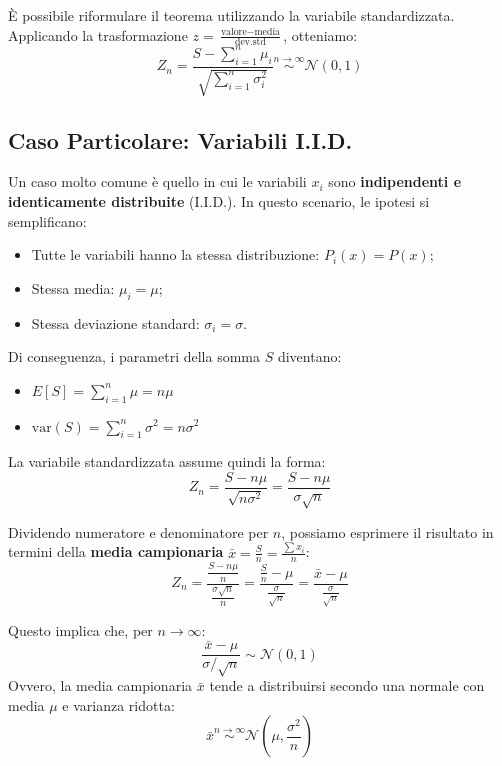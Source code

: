 \documentclass[openany,a4paper,12pt]{book}
\theoremstyle{remark}
\begin{document}
È possibile riformulare il teorema utilizzando la variabile standardizzata. Applicando la trasformazione $z = \frac{\text{valore} - \text{media}}{\text{dev.std}}$, otteniamo:
\[
Z_n = \frac{S - \sum_{i=1}^{n} \mu_i}{\sqrt{\sum_{i=1}^{n} \sigma_i^2}} \overset{n \to \infty}{\sim} \mathcal{N}(0,1)
\]

\subsection*{Caso Particolare: Variabili I.I.D.}
Un caso molto comune è quello in cui le variabili $x_i$ sono \textbf{indipendenti e identicamente distribuite} (I.I.D.). In questo scenario, le ipotesi si semplificano:
\begin{itemize}
    \item Tutte le variabili hanno la stessa distribuzione: $P_i(x) = P(x)$;
    \item Stessa media: $\mu_i = \mu$;
    \item Stessa deviazione standard: $\sigma_i = \sigma$.
\end{itemize}

Di conseguenza, i parametri della somma $S$ diventano:
\begin{itemize}
    \item $E[S] = \sum_{i=1}^n \mu = n\mu$
    \item $\text{var}(S) = \sum_{i=1}^n \sigma^2 = n\sigma^2$
\end{itemize}

La variabile standardizzata assume quindi la forma:
\begin{equation}
Z_n = \frac{S - n\mu}{\sqrt{n\sigma^2}} = \frac{S - n\mu}{\sigma\sqrt{n}}
\end{equation}

Dividendo numeratore e denominatore per $n$, possiamo esprimere il risultato in termini della \textbf{media campionaria} $\bar{x} = \frac{S}{n} = \frac{\sum x_i}{n}$:
\begin{equation}
Z_n = \frac{\frac{S - n\mu}{n}}{\frac{\sigma\sqrt{n}}{n}} = \frac{\frac{S}{n} - \mu}{\frac{\sigma}{\sqrt{n}}} = \frac{\bar{x} - \mu}{\frac{\sigma}{\sqrt{n}}}
\end{equation}

Questo implica che, per $n \to \infty$:
\begin{equation}
\frac{\bar{x} - \mu}{\sigma / \sqrt{n}} \sim \mathcal{N}(0, 1)
\end{equation}
Ovvero, la media campionaria $\bar{x}$ tende a distribuirsi secondo una normale con media $\mu$ e varianza ridotta:
\[
\bar{x} \overset{n\to\infty}{\sim} \mathcal{N}\left(\mu, \frac{\sigma^2}{n}\right)
\]
\end{document}
